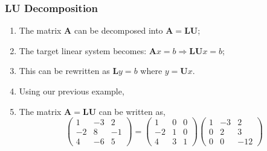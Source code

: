 \documentclass[10pt,compress,handout,ignorenonframetext]{beamer}
\begin{document}
\begin{frame}
  \frametitle{LU Decomposition} 
  \begin{enumerate}
     \item <1-> The matrix $\bm{A}$ can be decomposed into $\bm{A}=\bm{L}\bm{U}$;
     \item <2-> The target linear system becomes: $\bm{A}x=b \Longrightarrow \bm{L}\bm{U}x=b$;
     \item <3-> This can be rewritten as $\bm{L}y=b$ where $y=\bm{U}x$.
     \item <4-> Using our previous example,
     \item <5-> The matrix $\bm{A}=\bm{L}\bm{U}$ can be written as,
          \begin{displaymath}
             \begin{pmatrix}
                1 & -3 & 2 \\ -2 & 8 & -1 \\ 4 & -6 & 5
             \end{pmatrix}=
             \begin{pmatrix}
                1 & 0 & 0 \\ -2 & 1 & 0 \\ 4 & 3 & 1
             \end{pmatrix}
             \begin{pmatrix}
                1 & -3 & 2 \\ 0 & 2 & 3 \\ 0 & 0 & -12
             \end{pmatrix}
          \end{displaymath}
  \end{enumerate}
\end{frame}
\end{document}
